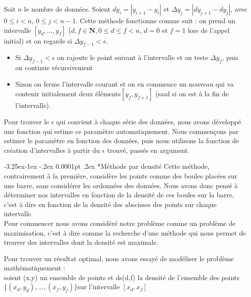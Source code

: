 \documentclass[a4paper,12pt]{article} %
\makeatletter
\renewcommand\subparagraph{\@startsection{subparagraph}{5}{\z@}%
                                      {-3.25ex\@plus -1ex \@minus -.2ex}%
                                      {0.0001pt \@plus .2ex}%
                                      {\normalfont\normalsize\bfseries}}
\makeatother
\begin{document}
    				    Soit $n$ le nombre de données.
                        Soient $dy_i=|y_{i+1}-y_i|$  et $\Delta y_j=|dy_{j+1}-dy_j|$,  avec  $0\le i < n$, $ 0 \le j< n-1$. Cette méthode fonctionne comme suit : on prend un intervalle $[y_d,…,y_f ]$ ($d,f \in \mathbf{N}, 0 \le d \le f < n$, $d = 0$ et $f = 1$ lors de l'appel initial) et on regarde si $\Delta y_{f-1}<\epsilon$.
                        \begin{itemize}
                        \item 	Si $\Delta y_{f-1}<\epsilon$ on rajoute le point suivant à l'intervalle et on teste $\Delta y_f$, puis on continue récursivement
                        \item 	Sinon on ferme l'intervalle courant et on en commence un nouveau qui va contenir initialement deux éléments$[y_f,y_{f+1}]$ (sauf si on est à la fin de l'intervalle).
                        \end{itemize}
                        Pour trouver le $\epsilon$ qui convient à chaque série des données, nous avons développé une fonction qui estime ce paramètre automatiquement. Nous commençons par estimer le paramètre en fonction des données, puis nous utilisons la fonction de création d'intervalles à partir du $\epsilon$ trouvé, passés en argument.
                        
			        \subparagraph*{Méthode par densité}
    				    Cette méthode, contrairement à la première, considère les points comme des boules placées sur une barre, sans considérer les ordonnées des données. Nous avons donc pensé à déterminer nos intervalles en fonction de la densité de ces boules sur la barre, c'est à dire en fonction de la densité des abscisses des points sur chaque intervalle.\\
    				    
                        Pour commencer nous avons considéré notre problème comme un problème de maximisation, c'est à dire comme la recherche d'une méthode qui nous permet de trouver des intervalles dont la densité est maximale.
                        
                        
                        Pour trouver un résultat optimal, nous avons essayé de modéliser le problème mathématiquement :\\
                        soient (x,y) un ensemble de points et ds(d,f) la densité de l'ensemble des points
                        $\{( x_d, y_d),…,( x_f, y_f ) \}$sur l'intervalle $[ x_d,x_f]$
                        	
\end{document}
